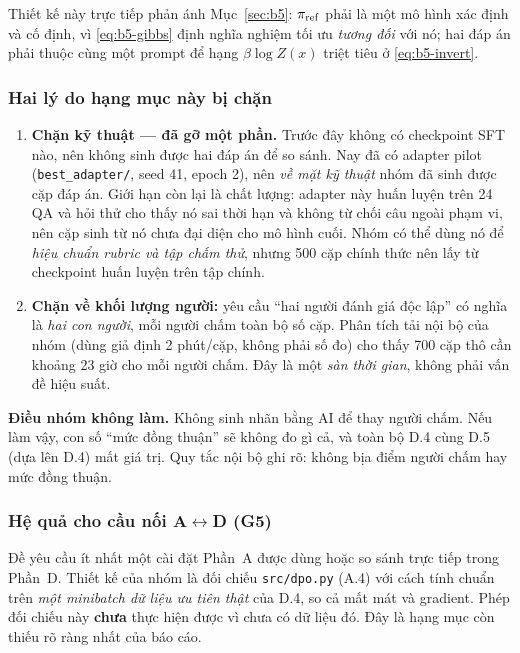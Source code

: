 Thiết kế này trực tiếp phản ánh Mục~\ref{sec:b5}: $\pi_{\mathrm{ref}}$ phải là một mô hình xác
định và cố định, vì \eqref{eq:b5-gibbs} định nghĩa nghiệm tối ưu \emph{tương đối}
với nó; hai đáp án phải thuộc cùng một prompt để hạng $\beta\log Z(x)$ triệt tiêu
ở \eqref{eq:b5-invert}.

\subsubsection{Hai lý do hạng mục này bị chặn}

\begin{enumerate}[leftmargin=2em]
\item \textbf{Chặn kỹ thuật --- đã gỡ một phần.} Trước đây không có checkpoint SFT
nào, nên không sinh được hai đáp án để so sánh. Nay đã có adapter pilot
(\texttt{best\_adapter/}, seed 41, epoch 2), nên \emph{về mặt kỹ thuật} nhóm đã
sinh được cặp đáp án. Giới hạn còn lại là chất lượng: adapter này huấn luyện trên
24 QA và hỏi thử cho thấy nó sai thời hạn và không từ chối câu ngoài phạm vi, nên
cặp sinh từ nó chưa đại diện cho mô hình cuối. Nhóm có thể dùng nó để \emph{hiệu
chuẩn rubric và tập chấm thử}, nhưng 500 cặp chính thức nên lấy từ checkpoint huấn
luyện trên tập chính.
\item \textbf{Chặn về khối lượng người:} yêu cầu ``hai người đánh giá độc lập'' có
nghĩa là \emph{hai con người}, mỗi người chấm toàn bộ số cặp. Phân tích tải nội bộ
của nhóm (dùng giả định 2 phút/cặp, không phải số đo) cho thấy 700 cặp thô cần
khoảng 23 giờ cho mỗi người chấm. Đây là một \emph{sàn thời gian}, không phải vấn
đề hiệu suất.
\end{enumerate}

\textbf{Điều nhóm không làm.} Không sinh nhãn bằng AI để thay người chấm. Nếu làm
vậy, con số ``mức đồng thuận'' sẽ không đo gì cả, và toàn bộ D.4 cùng D.5 (dựa lên
D.4) mất giá trị. Quy tắc nội bộ ghi rõ: không bịa điểm người chấm hay mức đồng
thuận.

\subsubsection{Hệ quả cho cầu nối A$\leftrightarrow$D (G5)}

Đề yêu cầu ít nhất một cài đặt Phần~A được dùng hoặc so sánh trực tiếp trong
Phần~D. Thiết kế của nhóm là đối chiếu \texttt{src/dpo.py} (A.4) với cách tính
chuẩn trên \emph{một minibatch dữ liệu ưu tiên thật} của D.4, so cả mất mát và
gradient. Phép đối chiếu này \textbf{chưa} thực hiện được vì chưa có dữ liệu đó.
Đây là hạng mục còn thiếu rõ ràng nhất của báo cáo.


